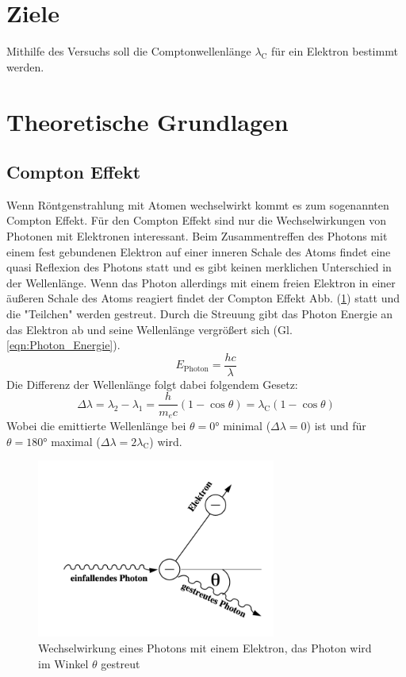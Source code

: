 \section{Ziele}
Mithilfe des Versuchs soll die Comptonwellenlänge $\lambda_{\text{C}}$ für ein Elektron bestimmt werden.

\section{Theoretische Grundlagen}
\label{sec:theorie}

\subsection{Compton Effekt}
Wenn Röntgenstrahlung mit Atomen wechselwirkt kommt es zum sogenannten Compton Effekt.
Für den Compton Effekt sind nur die Wechselwirkungen von Photonen mit Elektronen interessant.
Beim Zusammentreffen des Photons mit einem fest gebundenen Elektron auf einer inneren Schale des Atoms findet eine quasi Reflexion des Photons statt und es gibt keinen merklichen Unterschied in der Wellenlänge.
Wenn das Photon allerdings mit einem freien Elektron in einer äußeren Schale des Atoms reagiert findet der Compton Effekt Abb. (\ref{fig:Compton_Effekt}) statt und die "Teilchen" werden gestreut.
Durch die Streuung gibt das Photon Energie an das Elektron ab und seine Wellenlänge vergrößert sich (Gl. \ref{eqn:Photon_Energie}).
\begin{equation}
    E_{\text{Photon}} = \frac{hc}{\lambda} \label{eqn:Photon_Energie}
\end{equation}
Die Differenz der Wellenlänge folgt dabei folgendem Gesetz:
\begin{equation*}
    \Delta \lambda = \lambda_2 - \lambda_1
                    = \frac{h}{m_e c}\left( 1- \cos \theta \right) 
                    = \lambda_{\text{C}} \left( 1- \cos \theta \right) \label{eqn:Compton_Gesetz} 
\end{equation*}
Wobei die emittierte Wellenlänge bei $\theta = 0°$ minimal ($\Delta\lambda = 0$) ist und für $\theta = 180°$ maximal ($\Delta\lambda = 2\lambda_{\text{C}}$) wird.
\begin{figure}
    \centering
    \includegraphics[width=0.7\textwidth]{bilder/Compton_Effekt.png}
    \caption{Wechselwirkung eines Photons mit einem Elektron, das Photon wird im Winkel $\theta$ gestreut}
    \label{fig:Compton_Effekt}
\end{figure}
